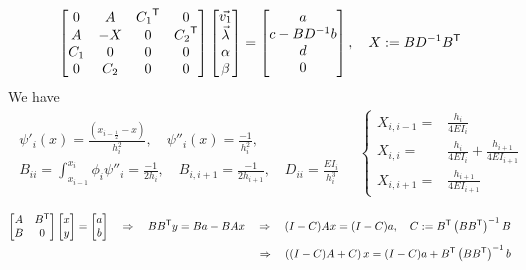 %
\begin{align*}
\begin{bmatrix}
0 & {A}& {C_1}^{\mathsf{T}}&0\\
A & -X& 0&{C_2}^{\mathsf{T}}\\
C_1 & 0  & 0& 0\\
0 & C_2  & 0& 0
\end{bmatrix}
\begin{bmatrix}
\vec{v_1} \\ \vec{\lambda}\\ \alpha \\ \beta
\end{bmatrix}
=
\begin{bmatrix}
a  \\ c- BD^{-1}b\\ d\\0
\end{bmatrix},\quad X:= BD^{-1}{B}^{\mathsf{T}}
\end{align*}
%
We have
%
\begin{align*}
\begin{aligned}
\psi'_i(x)=\frac{(x_{i-\frac12} -x)}{h_i^2},\quad
\psi''_i(x)=\frac{-1}{h_i^2},\\
B_{ii} = \int_{x_{i-1}}^{x_i} \phi_i\psi''_i = \frac{-1}{2h_i},\quad
B_{i,i+1} = \frac{-1}{2h_{i+1}}, \quad D_{ii} = \frac{EI_i}{h_i^3}
\end{aligned}\quad
%
\left\{
\begin{aligned}
X_{i,i-1} =& \frac{h_i}{4EI_i}\\
X_{i,i} =& \frac{h_i}{4EI_i}+\frac{h_{i+1}}{4EI_{i+1}}\\
X_{i,i+1} =& \frac{h_{i+1}}{4EI_{i+1}}
\end{aligned}
\right.
%
\end{align*}
%

\begin{align*}
\begin{bmatrix}
A & {B}^{\mathsf{T}}\\
B & 0
\end{bmatrix}
\begin{bmatrix}
x\\y
\end{bmatrix}
=
\begin{bmatrix}
a  \\ b
\end{bmatrix}
\quad\Rightarrow\quad 
B{B}^{\mathsf{T}}y = Ba- BA x
\quad\Rightarrow\quad 
(I-C)Ax = (I-C)a,\quad C:={B}^{\mathsf{T}}\left(B{B}^{\mathsf{T}}\right)^{-1}B\\
\quad\Rightarrow\quad 
\left((I-C)A + C \right)x = (I-C)a + {B}^{\mathsf{T}}\left(B{B}^{\mathsf{T}}\right)^{-1}b
\end{align*}


%
%
\printbibliography[title=References Section~\thesection]
